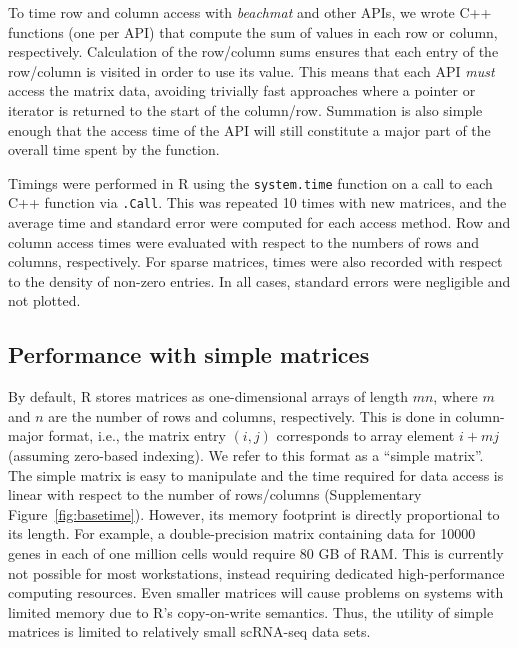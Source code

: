 \documentclass{article}
\newcommand{\beachmat}{\textit{beachmat}}
\newcommand{\code}[1]{\texttt{#1}}
\begin{document}
To time row and column access with \beachmat{} and other APIs, we wrote C++ functions (one per API) that compute the sum of values in each row or column, respectively.
Calculation of the row/column sums ensures that each entry of the row/column is visited in order to use its value.
This means that each API \textit{must} access the matrix data, avoiding trivially fast approaches where a pointer or iterator is returned to the start of the column/row.
Summation is also simple enough that the access time of the API will still constitute a major part of the overall time spent by the function.

Timings were performed in R using the \code{system.time} function on a call to each C++ function via \code{.Call}. 
This was repeated 10 times with new matrices, and the average time and standard error were computed for each access method. 
Row and column access times were evaluated with respect to the numbers of rows and columns, respectively.
For sparse matrices, times were also recorded with respect to the density of non-zero entries.
In all cases, standard errors were negligible and not plotted.

\subsection{Performance with simple matrices}
By default, R stores matrices as one-dimensional arrays of length $mn$, where $m$ and $n$ are the number of rows and columns, respectively.
This is done in column-major format, i.e., the matrix entry $(i, j)$ corresponds to array element $i + mj$ (assuming zero-based indexing).
We refer to this format as a ``simple matrix''.
The simple matrix is easy to manipulate and the time required for data access is linear with respect to the number of rows/columns (Supplementary Figure~\ref{fig:basetime}).
However, its memory footprint is directly proportional to its length.
For example, a double-precision matrix containing data for 10000 genes in each of one million cells would require 80 GB of RAM.
This is currently not possible for most workstations, instead requiring dedicated high-performance computing resources.
Even smaller matrices will cause problems on systems with limited memory due to R's copy-on-write semantics.
Thus, the utility of simple matrices is limited to relatively small scRNA-seq data sets.

\end{document}
